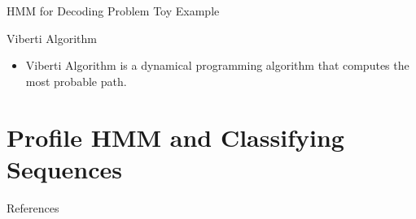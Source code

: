 \documentclass{beamer}
\begin{document}
\begin{frame}{HMM for Decoding Problem}
	Toy Example
	
\end{frame} 
\begin{frame}{Viberti Algorithm}
	\begin{itemize}
		\item Viberti Algorithm is a dynamical programming algorithm that computes the most probable path.
	\end{itemize}
\end{frame}

\section{Profile HMM and Classifying Sequences}

\begin{frame}{References}
	
	
\end{frame}
\end{document}
